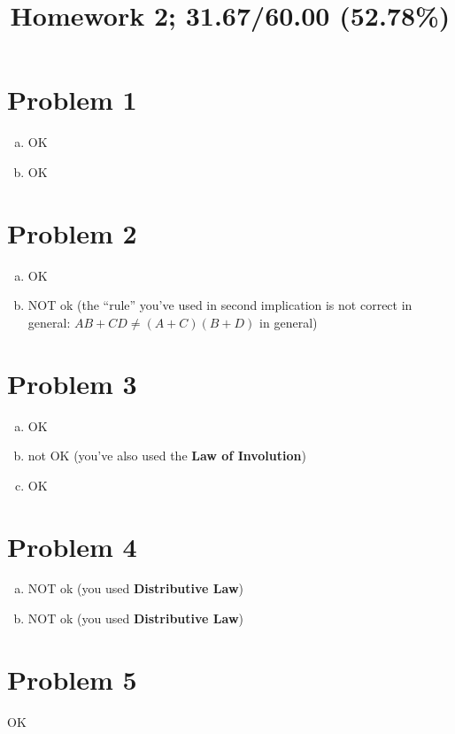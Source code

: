 \documentclass[10pt]{article} %
\title{Homework 2;
31.67/60.00 (52.78\%)
}
\begin{document}
\maketitle

\section*{Problem 1 }
\begin{enumerate}[(a)]
  \item OK
  \item OK
\end{enumerate}
\section*{Problem 2 }
\begin{enumerate}[(a)]
  \item OK
  \item NOT ok (the ``rule'' you've used in second implication is not correct in general: $AB+CD\neq (A+C)(B+D)$ in general)
\end{enumerate}
\section*{Problem 3 }
\begin{enumerate}[(a)]
  \item OK
  \item not OK (you've also used the \textbf{Law of Involution})
  \item OK
\end{enumerate}
\section*{Problem 4 }
\begin{enumerate}[(a)]
  \item NOT ok (you used \textbf{Distributive Law})
  \item NOT ok (you used \textbf{Distributive Law})
\end{enumerate}
\section*{Problem 5 }
OK
\end{document}
